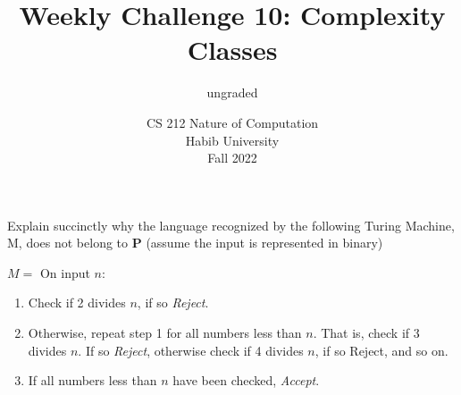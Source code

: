 \documentclass[a4paper]{exam}
\title{Weekly Challenge 10: Complexity Classes}
\author{ungraded} %
\date{CS 212 Nature of Computation\\Habib University\\Fall 2022}
\begin{document}
\maketitle

\begin{questions}
  

Explain succinctly why the language recognized by the following Turing Machine, M, does not belong to $\mathbf{P}$ (assume the input is represented in binary)

$M = $ On input $n$:
\begin{enumerate}
\item Check if 2 divides $n$, if so \textit{Reject}.
\item Otherwise, repeat step 1 for all numbers less than $n$. That is, check if 3 divides $n$. If so \textit{Reject}, otherwise check if 4 divides $n$, if so Reject, and so on.
\item If all numbers less than $n$ have been checked, \textit{Accept}.  
\end{enumerate}
\begin{solution}
  \end{solution}
\end{questions}
\end{document}
